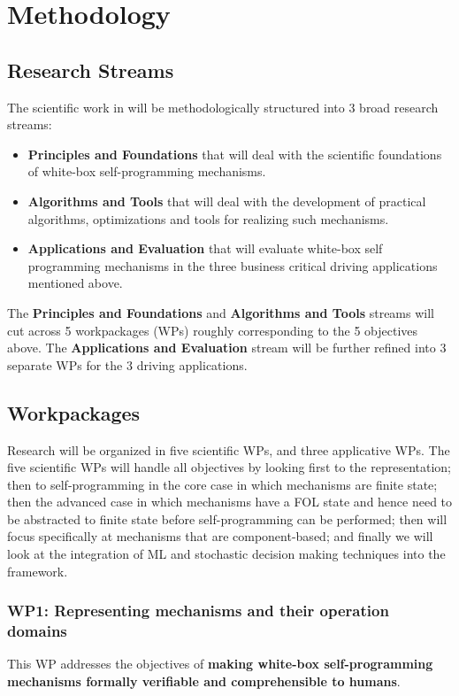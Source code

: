 \section{Methodology}

\subsection{Research Streams}
The scientific work in \project will be methodologically structured into 3 broad research streams:
\begin{itemize}
\item \textbf{Principles and Foundations} that will deal with the
scientific foundations of white-box self-programming mechanisms. 

\item \textbf{Algorithms and Tools}  that will deal with the
development of practical algorithms, optimizations and tools for realizing
such mechanisms. 

\item \textbf{Applications and Evaluation}  that will evaluate white-box self programming mechanisms in the three business critical driving applications  mentioned above.
\end{itemize}
The \textbf{Principles and Foundations} and \textbf{Algorithms and Tools} streams
will cut across 5 workpackages (WPs) roughly corresponding to the 5
objectives above.  The \textbf{Applications and Evaluation} stream
will be further refined into 3 separate WPs for the 3 driving
applications. 



\subsection{Workpackages}


Research will be organized in five scientific WPs, and three applicative WPs. The five scientific WPs will handle all objectives by  looking first to the representation; then to self-programming in the core case in which mechanisms are finite state; then the advanced case in which mechanisms have a FOL state and hence need to be abstracted to finite state before self-programming  can be performed; then will focus specifically at mechanisms that are component-based; and finally we will look at the integration of ML and stochastic decision making techniques into the framework.




\subsubsection*{WP1: Representing mechanisms and their operation domains}
This WP addresses the objectives of \textbf{making white-box self-programming mechanisms formally verifiable and  comprehensible to
    humans}.


